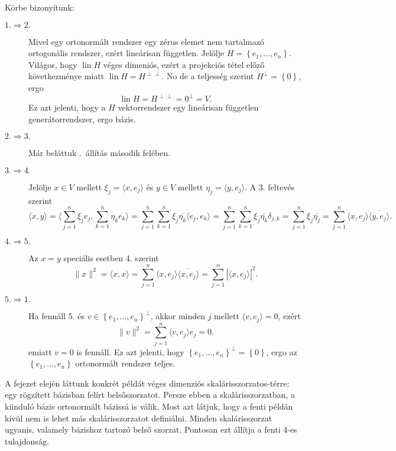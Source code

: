 \documentclass[9pt, a4paper, showtrims]{memoir}
\makeatletter
\renewenvironment{proof}[1][\proofname]
    {\par\pushQED{\qed}%
    \normalfont \topsep6\p@\@plus6\p@\relax
    \trivlist
    \item[\hskip\labelsep
        \itshape
    #1\@addpunct{:}]\ignorespaces}
    {\popQED\endtrivlist\@endpefalse}
\theoremstyle{plain}
\theoremstyle{remark}
\theoremstyle{definition}
\DeclareMathOperator{\lin}{lin}
\newcommand{\ip}[2]{\langle#1,#2\rangle}
\makeatother
\begin{document}
\begin{proof}
    Körbe bizonyítunk:
    \begin{description}
        \item[$1.\Rightarrow 2.$]
    Mivel egy ortonormált rendszer egy zérus elemet nem tartalmazó ortogonális rendszer, 
    ezért lineárisan független.
    Jelölje $H=\left\{ e_1,\dots,e_n \right\}$. 
    Világos, hogy $\lin H$ véges dimeniós, ezért a projekciós tétel előző következménye miatt
    $\lin H=H^{\perp\perp}$.
    No de a teljesség szerint $H^\perp=\left\{ 0 \right\}$,
    ergo
    \[
        \lin H
        =
        H^{\perp\perp}
        =
        {0}^\perp
        =
        V.
    \]
    Ez azt jelenti, hogy a $H$ vektorrendszer egy lineárisan független generátorrendszer, ergo bázis.

    \item[$2.\Rightarrow 3.$]
    Már beláttuk .~állítás második felében.

    \item[$3.\Rightarrow 4.$]
    Jelölje $x\in V$ mellett $\xi_j=\ip{x}{e_j}$ és $y\in V$ mellett
    $\eta_j=\ip{y}{e_j}$.
    A 3. feltevés szerint
    \[
        \ip{x}{y}
        =
        \ip{\sum_{j=1}^n\xi_je_j}{\sum_{k=1}^n\eta_ke_k}
        =
        \sum_{j=1}^n\sum_{k=1}^n\xi_j\overline{\eta_k}\ip{e_j}{e_k}
        =
        \sum_{j=1}^n\sum_{k=1}^n\xi_j\overline{\eta_k}\delta_{j,k}
        =
        \sum_{j=1}^n\xi_j\overline{\eta_j}
        =
        \sum_{j=1}^n\ip{x}{e_j}\overline{\ip{y}{e_j}}.
    \]

    \item[$4.\Rightarrow 5.$]
    Az $x=y$ speciális esetben 4. szerint
    \[
        \|x\|^2
        =
        \ip{x}{x}
        =
        \sum_{j=1}^n\ip{x}{e_j}\overline{\ip{x}{e_j}}
        =
        \sum_{j=1}^n|\ip{x}{e_j}|^2.
    \]

    \item[$5.\Rightarrow 1.$]
    Ha fennáll 5. és $v\in\left\{ e_1,\dots,e_n \right\}^\perp$,
    akkor minden $j$ mellett $\ip{v}{e_j}=0$, ezért 
    \[
        \|v\|^2
        =
        \sum_{j=1}^n\ip{v}{e_j}e_j
        =
        0.
    \]
    emiatt $v=0$ is fennáll. 
    Ez azt jelenti, hogy $\left\{ e_1,\dots,e_n \right\}^\perp=\left\{ 0 \right\}$, 
    ergo az $\left\{ e_1,\dots,e_n \right\}$ ortonormált rendszer teljes.\qedhere
    \end{description}
\end{proof}
A fejezet elején láttunk konkrét példát véges dimenziós skalárisszorzatos-térre:
egy rögzített bázisban felírt belsőszorzatot. Persze ebben a skalárisszorzatban,
a kiinduló bázis ortonormált bázissá is válik.
Most azt látjuk, hogy a fenti példán kívül nem is lehet más skalárisszorzatot definiálni.
Minden skalárisszorzat ugyanis, valamely bázishoz tartozó belső szorzat.
Pontosan ezt állítja a fenti 4-es tulajdonság.
\end{document}
